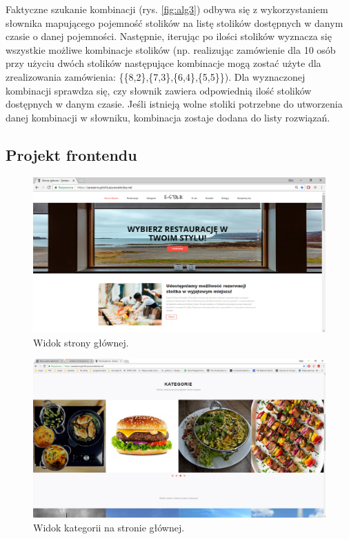 \documentclass{article}
\begin{document}
Faktyczne szukanie kombinacji (rys. \ref{fig:alg3}) odbywa się z wykorzystaniem słownika mapującego pojemność stolików na listę stolików dostępnych w danym czasie o danej pojemności. Następnie, iterując po ilości stolików wyznacza się wszystkie możliwe kombinacje stolików (np. realizując zamówienie dla 10 osób przy użyciu dwóch stolików następujące kombinacje mogą zostać użyte dla zrealizowania zamówienia: \{\{8,2\},\{7,3\},\{6,4\},\{5,5\}\}). Dla wyznaczonej kombinacji sprawdza się, czy słownik zawiera odpowiednią ilość stolików dostępnych w danym czasie. Jeśli istnieją wolne stoliki potrzebne do utworzenia danej kombinacji w słowniku, kombinacja zostaje dodana do listy rozwiązań.


\subsection{Projekt frontendu}

\begin{figure}[H]
\centering
	\includegraphics[width=1.00\textwidth]{screens/index1.png}
	\caption[caption]{Widok strony głównej.}
	\label{fig:index}
\end{figure}

\begin{figure}[H]
\centering
	\includegraphics[width=1.00\textwidth]{screens/index2.png}
	\caption[caption]{Widok kategorii na stronie głównej.}
	\label{fig:index_category}
\end{figure}
\end{document}
